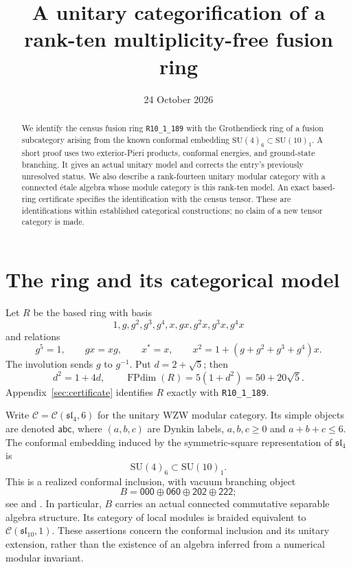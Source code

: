 \documentclass[11pt]{amsart}
\title[A rank-ten conformal-embedding model]{A unitary categorification of a rank-ten multiplicity-free fusion ring}
\date{24 October 2026}
\theoremstyle{remark}
\newcommand{\C}{\mathcal C}
\newcommand{\FPdim}{\operatorname{FPdim}}
\newcommand{\SU}{\mathrm{SU}}
\newcommand{\wt}[1]{\mathsf{#1}}
\begin{document}
\begin{abstract}
We identify the census fusion ring \texttt{R10\_1\_189} with the
Grothendieck ring of a fusion subcategory arising from the known conformal
embedding $\SU(4)_6\subset\SU(10)_1$. A short proof uses two exterior-Pieri
products, conformal energies, and ground-state branching. It gives an
actual unitary model and corrects the entry's previously unresolved
status. We also describe a rank-fourteen unitary modular category with a
connected \'etale algebra whose module category is this rank-ten model.
An exact based-ring certificate specifies the identification with the
census tensor. These are identifications within established categorical
constructions; no claim of a new tensor category is made.
\end{abstract}
\maketitle

\section{The ring and its categorical model}

Let $R$ be the based ring with basis
\[
  1,g,g^2,g^3,g^4,x,gx,g^2x,g^3x,g^4x
\]
and relations
\begin{equation}\label{eq:ring}
 g^5=1,\qquad gx=xg,\qquad x^*=x,\qquad
 x^2=1+(g+g^2+g^3+g^4)x.
\end{equation}
The involution sends $g$ to $g^{-1}$. Put $d=2+\sqrt5$; then
\begin{equation}\label{eq:dim}
 d^2=1+4d,\qquad \FPdim(R)=5(1+d^2)=50+20\sqrt5.
\end{equation}
Appendix~\ref{sec:certificate} identifies $R$ exactly with
\texttt{R10\_1\_189}.

Write $\C=\C(\mathfrak{sl}_4,6)$ for the unitary WZW modular category.
Its simple objects are denoted $\wt{abc}$, where $(a,b,c)$ are Dynkin
labels, $a,b,c\geq0$ and $a+b+c\leq6$. The conformal embedding induced by
the symmetric-square representation of $\mathfrak{sl}_4$ is
\begin{equation}\label{eq:embedding}
 \SU(4)_6\subset\SU(10)_1.
\end{equation}
This is a realized conformal inclusion, with vacuum branching object
\begin{equation}\label{eq:B}
 B=\wt{000}\oplus\wt{060}\oplus\wt{202}\oplus\wt{222};
\end{equation}
see \cite[p.~29 of the arXiv version]{BE} and
\cite[\S\S1.4.3--1.4.5]{CS}. In particular, $B$ carries an actual
connected commutative separable algebra structure. Its category of local
modules is braided equivalent to $\C(\mathfrak{sl}_{10},1)$.
These assertions concern the conformal inclusion and its unitary
extension, rather than the existence of an algebra inferred from a
numerical modular invariant.
\end{document}
